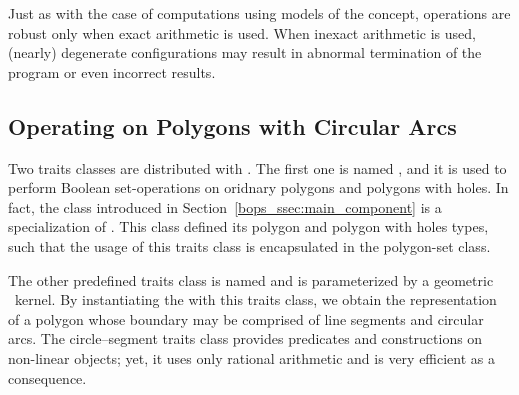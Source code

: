 Just as with the case of computations using models of the 
 concept, operations are robust only
when exact arithmetic is used. When inexact arithmetic is used,
(nearly) degenerate configurations may result in abnormal termination
of the program or even incorrect results.

\subsection{Operating on Polygons with Circular Arcs}
\label{bso_ssec:circ_seg}

Two traits classes are distributed with \cgal. The first one is named
, and it is used to perform Boolean
set-operations on oridnary polygons and polygons with holes. In fact,
the class  introduced in
Section~\ref{bops_ssec:main_component} is a specialization of
. This class defined
its polygon and polygon with holes types, such that the usage of this
traits class is encapsulated in the polygon-set class.

The other predefined traits class is named 
 and is parameterized by a
geometric \cgal\ kernel. By instantiating the 
with this traits class, we obtain the representation of a polygon whose
boundary may be comprised of line segments and circular arcs.
The circle--segment traits class provides predicates and constructions
on non-linear objects; yet, it uses only rational arithmetic and is
very efficient as a consequence.

